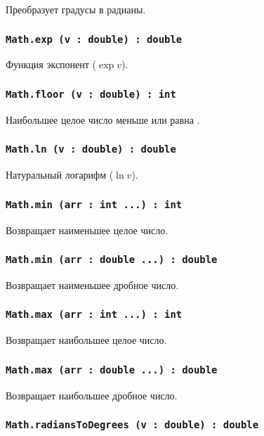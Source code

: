 Преобразует градусы в радианы.

\subsubsection{\lstinline|Math.exp (v : double) : double|}

Функция экспонент ($\exp{v}$).

\subsubsection{\lstinline|Math.floor (v : double) : int|}

Наибольшее целое число меньше или равна .

\subsubsection{\lstinline|Math.ln (v : double) : double|}

Натуральный логарифм ($\ln{v}$).

\subsubsection{\lstinline|Math.min (arr : int ...) : int|}

Возвращает наименьшее целое число.

\subsubsection{\lstinline|Math.min (arr : double ...) : double|}

Возвращает наименьшее дробное число.

\subsubsection{\lstinline|Math.max (arr : int ...) : int|}

Возвращает наибольшее целое число.

\subsubsection{\lstinline|Math.max (arr : double ...) : double|}

Возвращает наибольшее дробное число.

\subsubsection{\lstinline|Math.radiansToDegrees (v : double) : double|}

